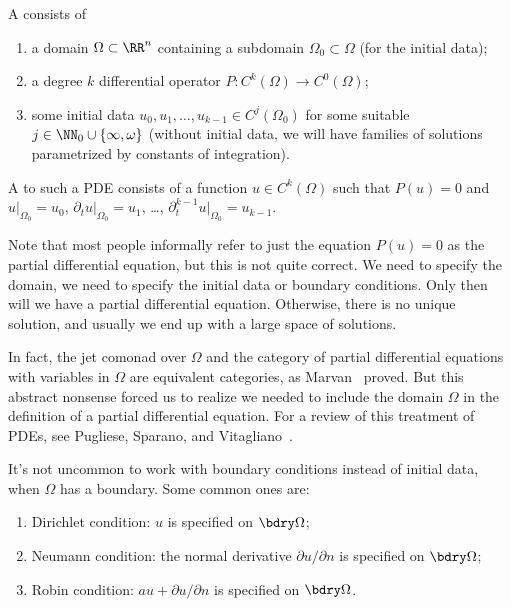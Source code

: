 \begin{definition}\label{pde-000D}%
A  consists of
\begin{enumerate}
\item a domain $\Omega\subset\RR^{n}$ containing a subdomain
  $\Omega_{0}\subset\Omega$ (for the initial data);
\item a degree $k$ differential operator $P\colon C^{k}(\Omega)\to C^{0}(\Omega)$;
\item some initial data $u_{0},u_{1},\dots,u_{k-1}\in C^{j}(\Omega_{0})$ for some suitable
  $j\in\NN_{0}\cup\{\infty,\omega\}$ (without initial data, we will have
  families of solutions parametrized by constants of integration).
\end{enumerate}
A  to such a PDE consists of a function $u\in C^{k}(\Omega)$
such that $P(u)=0$ and $u|_{\Omega_{0}}=u_{0}$, $\partial_{t}u|_{\Omega_{0}}=u_{1}$,
\dots, $\partial_{t}^{k-1}u|_{\Omega_{0}}=u_{k-1}$.

\begin{node}\label{pde-000F}%
Note that most people informally refer to just the equation $P(u)=0$ as the
partial differential equation, but this is not quite correct. We need to
specify the domain, we need to specify the initial data or boundary
conditions. Only then will we have a partial differential equation.
Otherwise, there is no unique solution, and usually we end up with a
large space of solutions.

In fact, the jet comonad over $\Omega$ and the category of partial
differential equations with variables in $\Omega$ are equivalent
categories, as Marvan~\cite{marvan1986note} proved. But this abstract
nonsense forced us to realize we needed to include the domain $\Omega$
in the definition of a partial differential equation. For a review of
this treatment of PDEs, see Pugliese, Sparano, and
Vitagliano~\cite{pugliese2023vinogradovs}. 
\end{node}

\begin{node}\label{pde-000E}%
It's not uncommon to work with boundary conditions instead of initial
data, when $\Omega$ has a boundary.
Some common ones are:
\begin{enumerate}
\item Dirichlet condition: $u$ is specified on $\bdry\Omega$;
\item Neumann condition: the normal derivative $\partial u/\partial n$ 
  is specified on $\bdry\Omega$;
\item Robin condition: $au+\partial u/\partial n$ is specified on $\bdry\Omega$.
\end{enumerate}
\end{node}
\end{definition}

